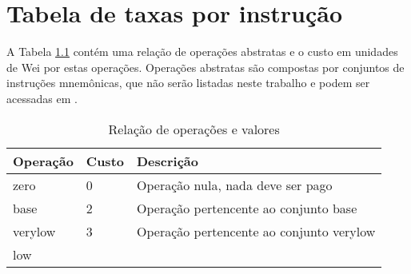 \chapter{Tabela de taxas por instrução}\label{annx:taxas-por-instrução}

A Tabela \ref{tab:taxa-por-instrucao} contém uma relação de operações abstratas e o custo em unidades de Wei por estas operações. Operações abstratas são compostas por conjuntos de instruções mnemônicas, que não serão listadas neste trabalho e podem ser acessadas em \cite{wood2014ethereum}.

\begin{table}[]
\begin{tabular}{|l|l|l|}
\hline
Operação & Custo & Descrição \\ \hline
zero & 0 & Operação nula, nada deve ser pago \\ \hline
base & 2 & Operação pertencente ao conjunto base \\ \hline
verylow & 3 & Operação pertencente ao conjunto verylow \\ \hline
low &  &  \\ \hline
\end{tabular}
\caption{Relação de operações e valores}
\label{tab:taxa-por-instrucao}
\end{table}